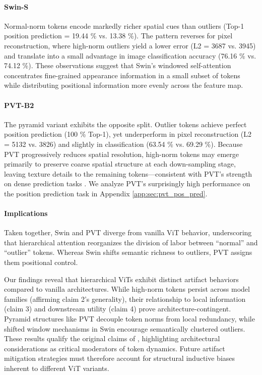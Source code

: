 \documentclass[10pt]{article} %
\begin{document}
\paragraph{Swin-S} Normal-norm tokens encode markedly richer spatial cues than outliers (Top-1 position prediction = 19.44 \% vs. 13.38 \%). The pattern reverses for pixel reconstruction, where high-norm outliers yield a lower error (L2 = 3687 vs. 3945) and translate into a small advantage in image classification accuracy (76.16 \% vs. 74.12 \%). These observations suggest that Swin’s windowed self-attention concentrates fine-grained appearance information in a small subset of tokens while distributing positional information more evenly across the feature map.
\paragraph{PVT-B2} The pyramid variant exhibits the opposite split. Outlier tokens achieve perfect position prediction (100 \% Top-1), yet underperform in pixel reconstruction (L2 = 5132 vs. 3826) and slightly in classification (63.54 \% vs. 69.29 \%). Because PVT progressively reduces spatial resolution, high-norm tokens may emerge primarily to preserve coarse spatial structure at each down-sampling stage, leaving texture details to the remaining tokens—consistent with PVT’s strength on dense prediction tasks \citep{wang2022pvt}. We analyze PVT's surprisingly high performance on the position prediction task in Appendix \ref{app:sec:pvt_pos_pred}. 
\paragraph{Implications} Taken together, Swin and PVT diverge from vanilla ViT behavior, underscoring that hierarchical attention reorganizes the division of labor between “normal” and “outlier” tokens. Whereas Swin shifts semantic richness to outliers, PVT assigns them positional control. 

Our findings reveal that hierarchical ViTs exhibit distinct artifact behaviors compared to vanilla architectures. While high-norm tokens persist across model families (affirming claim 2’s generality), their relationship to local information (claim 3) and downstream utility (claim 4) prove architecture-contingent. Pyramid structures like PVT decouple token norms from local redundancy, while shifted window mechanisms in Swin encourage semantically clustered outliers. These results qualify the original claims of \citet{darcet2024registers}, highlighting architectural considerations as critical moderators of token dynamics. Future artifact mitigation strategies must therefore account for structural inductive biases inherent to different ViT variants.
\end{document}
